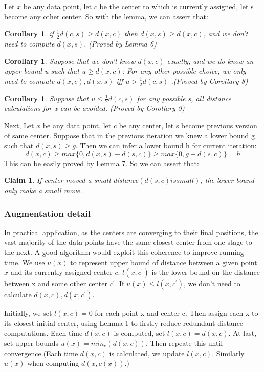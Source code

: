 \documentclass[11pt]{article}
\newtheorem{corollary}[theorem]{Corollary}
\newtheorem{claim}[theorem]{Claim}
\begin{document}
Let $x$ be any data point, let $c$ be the center to which is currently assigned, let s become any other center. So with the lemma, we can assert that:
\begin{corollary}
if $\frac{1}{2}d(c, s) \ge d(x,c)$ then $d(x, s) \ge d(x, c)$, and we don't need to compute $d(x,s)$. (Proved by Lemma 6)
\end{corollary}

\begin{corollary}
Suppose that we don't know $d(x,c)$ exactly, and we do know an upper bound u such that $u \ge d(x,c)$: For any other possible choice, we only need to compute $d(x, c), d(x, s)$ iff $u > \frac{1}{2}d(c, s)$ .(Proved by Corollary 8)
\end{corollary}
\begin{corollary}
Suppose that $u \le \frac{1}{2}d(c, s)$ for any possible s, all distance calculations for x can be avoided. (Proved by Corollary 9)
\end{corollary}

Next, Let $x$ be any data point, let $c$ be any center, let s become previous version of same center. Suppose that in the previous iteration we knew a lower bound g such that $d(x, s) \ge g$. Then we can infer a lower bound h for current iteration:
$$
d(x, c) \ge max\{0, d(x,s)-d(s,c)\} \ge max\{0, g-d(s,c)\} = h
$$
This can be easily proved by Lemma 7. So we can assert that:

\begin{claim}
If center moved a small distance$(d(s,c) is small)$, the lower bound only make a small move.
\end{claim}

\subsubsection{Augmentation detail}
In practical application, as the centers are converging to their final positions, the vast majority of the data points have the same closest center from one stage to the next. A good algorithm would exploit this coherence to improve running time. We use $u(x)$ to represent upper bound of distance between a given point $x$ and its currently assigned center $c$. $l(x,c^{\prime})$ is the lower bound on the distance between x and some other center $c^{\prime}$. If $u(x) \le l(x,c^{\prime}) $, we don't need to calculate $d(x,c), d(x, c^{\prime})$. \par
Initially, we set $l(x,c)=0$ for each point x and center c. Then assign each x to its closest initial center, using Lemma 1 to firstly reduce redundant distance computations. Each time $d(x,c)$ is computed, set $l(x,c)=d(x,c)$. At last, set upper bounds $u(x) = min_c(d(x,c))$. Then repeate this until convergence.(Each time $d(x,c)$ is calculated, we update $l(x,c)$. Similarly $u(x)$ when computing $d(x,c(x))$.)
\end{document}
